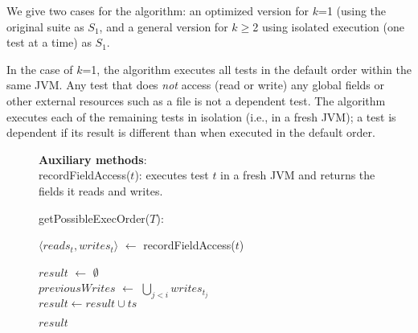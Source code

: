 We give two cases for the algorithm:  an optimized version for $k$=1 (using
the original suite as $S_1$, and
a general version for $k$$\ge$2 using isolated
execution (one test at a time) as $S_1$.

In the case of $k$=1, the algorithm executes all tests in the default order
within the same JVM\@.  Any test that does \textit{not}
access (read or write) any global fields or
other external resources such as a file is not a dependent test. 
The algorithm executes each of the remaining tests in isolation (i.e., in a
fresh JVM); a test is dependent if its result is different than when
executed in the default order.

\begin{figure}[t]
\textbf{Auxiliary methods}:\\
recordFieldAccess($\mathit{t}$): executes test $\mathit{t}$ in
a fresh JVM and returns the fields it reads and writes.\\


\vspace{-2mm}

getPossibleExecOrder($T$):\\
\vspace{-5mm}
\begin{algorithmic}[1]
\STATE $\langle \mathit{reads}_t, \mathit{writes}_t\rangle$ $\leftarrow$ recordFieldAccess($\mathit{t}$)\\ 
\ENDFOR

\STATE $\mathit{result}$ $\leftarrow$ $\emptyset$ \\
		\STATE $\mathit{previousWrites}$ $\leftarrow$ $\bigcup_{\mathit{j} < \mathit{i}}  \mathit{writes}_{t_j} $ \\
			\STATE $\mathit{result} \leftarrow \mathit{result} \cup \mathit{ts}$
		\ENDIF
	\ENDFOR

\ENDFOR
\RETURN $\mathit{result}$
\end{algorithmic}


\end{figure}
